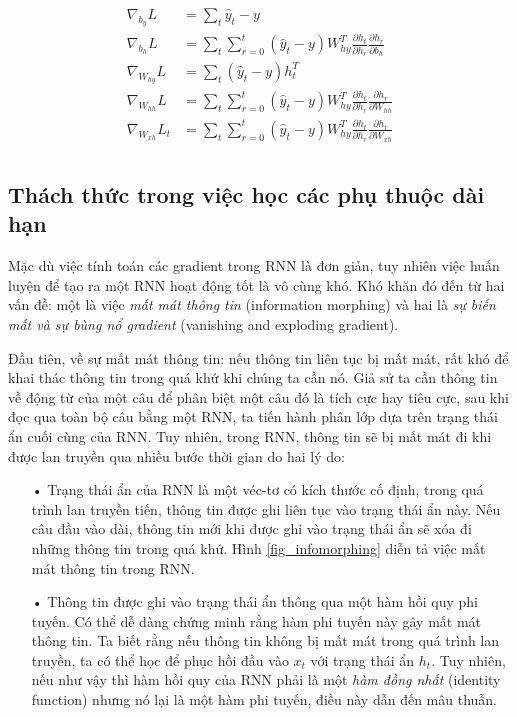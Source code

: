 \begin{align}
	\nabla_{b_{y}}L &= \sum_{t} \hat{y}_t - y \\ \label{updateParams2} 
    \nabla_{b_h}L &= \sum_{t} \sum_{r=0}^{t} (\hat{y}_t - y) W_{hy}^T \frac{\partial h_{t}}{\partial h_r} \frac{\partial h_r}{\partial b_h} \\ \label{updateParams3}
    \nabla_{W_{hy}}L &= \sum_{t} (\hat{y}_t - y) h_t^T \\ \label{updateParams4}
    \nabla_{W_{hh}}L &= \sum_{t} \sum_{r=0}^{t}  (\hat{y}_t - y) W_{hy}^T \frac{\partial h_{t}}{\partial h_r} \frac{\partial h_r}{\partial W_{hh}} \\ \label{updateParams5}
    \nabla_{W_{xh}}L_t &= \sum_{t} \sum_{r=0}^{t} (\hat{y}_t - y) W_{hy}^T \frac{\partial h_{t}}{\partial h_r} \frac{\partial h_r}{\partial W_{xh}} \\ \label{updateParams6} \nonumber
\end{align}

\subsection{Thách thức trong việc học các phụ thuộc dài hạn}

Mặc dù việc tính toán các gradient trong RNN là đơn giản, tuy nhiên việc huấn luyện để tạo ra một RNN hoạt động tốt là vô cùng khó. Khó khăn đó đến từ hai vấn đề: một là việc \textit{mất mát thông tin} (information morphing) và hai là \textit{sự biến mất và sự bùng nổ gradient} (vanishing and exploding gradient).

Đầu tiên, về sự mất mát thông tin: nếu thông tin liên tục bị mất mát, rất khó để khai thác thông tin trong quá khứ khi chúng ta cần nó. Giả sử ta cần thông tin về động từ của một câu để phân biệt một câu đó là tích cực hay tiêu cực, sau khi đọc qua toàn bộ câu bằng một RNN, ta tiến hành phân lớp dựa trên trạng thái ẩn cuối cùng của RNN. Tuy nhiên, trong RNN, thông tin sẽ bị mất mát đi khi được lan truyền qua nhiều bước thời gian do hai lý do: 
\begin{itemize}
\item[•] Trạng thái ẩn của RNN là một véc-tơ có kích thước cố định, trong quá trình lan truyền tiến, thông tin được ghi liên tục vào trạng thái ẩn này. Nếu câu đầu vào dài, thông tin mới khi được ghi vào trạng thái ẩn sẽ xóa đi những thông tin trong quá khứ. Hình \ref{fig_infomorphing} diễn tả việc mất mát thông tin trong RNN.
\item[•] Thông tin được ghi vào trạng thái ẩn thông qua một hàm hồi quy phi tuyến. Có thể dễ dàng chứng minh rằng hàm phi tuyến này gây mất mát thông tin. Ta biết rằng nếu thông tin không bị mất mát trong quá trình lan truyền, ta có thể học để phục hồi đầu vào $x_t$ với trạng thái ẩn $h_t$. Tuy nhiên, nếu như vậy thì hàm hồi quy của RNN phải là một \textit{hàm đồng nhất} (identity function) nhưng nó lại là một hàm phi tuyến, điều này dẫn đến mâu thuẫn.
\end{itemize}

